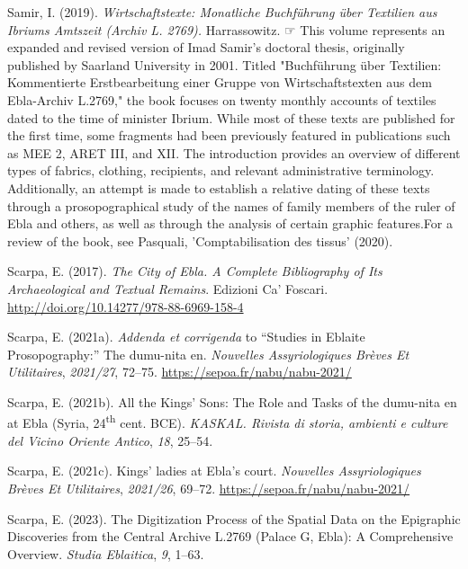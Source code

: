 \documentclass[
]{book}
\newlength{\cslhangindent}
\newlength{\cslentryspacingunit} %
\newenvironment{CSLReferences}[2] %
 {%
  \setlength{\parindent}{0pt}
  \ifodd #1
  \let\oldpar\par
  \def\par{\hangindent=\cslhangindent\oldpar}
  \fi
  \setlength{\parskip}{#2\cslentryspacingunit}
 }%
 {}
\newcommand{\CSLBlock}[1]{#1\hfill\break}
\begin{document}
\begin{CSLReferences}{1}{0}
\leavevmode{}%
Samir, I. (2019). \emph{Wirtschaftstexte: Monatliche Buchführung über Textilien aus Ibriums Amtszeit (Archiv L. 2769).} Harrassowitz.
\CSLBlock{\newline☞ This volume represents an expanded and revised version of Imad Samir's doctoral thesis, originally published by Saarland University in 2001. Titled "Buchführung über Textilien: Kommentierte Erstbearbeitung einer Gruppe von Wirtschaftstexten aus dem Ebla-Archiv L.2769," the book focuses on twenty monthly accounts of textiles dated to the time of minister Ibrium. While most of these texts are published for the first time, some fragments had been previously featured in publications such as MEE 2, ARET III, and XII. The introduction provides an overview of different types of fabrics, clothing, recipients, and relevant administrative terminology. Additionally, an attempt is made to establish a relative dating of these texts through a prosopographical study of the names of family members of the ruler of Ebla and others, as well as through the analysis of certain graphic features.For a review of the book, see Pasquali, 'Comptabilisation des tissus' (2020).}

\leavevmode{}%
Scarpa, E. (2017). \emph{The {City} of {Ebla}. {A Complete Bibliography} of {Its Archaeological} and {Textual Remains}}. Edizioni Ca' Foscari. \url{http://doi.org/10.14277/978-88-6969-158-4}

\leavevmode{}%
Scarpa, E. (2021a). \emph{Addenda et corrigenda} to {``{Studies} in {Eblaite Prosopography}:''} The dumu-nita en. \emph{Nouvelles Assyriologiques Brèves Et Utilitaires}, \emph{2021/27}, 72--75. \url{https://sepoa.fr/nabu/nabu-2021/}

\leavevmode{}%
Scarpa, E. (2021b). All the Kings' Sons: The Role and Tasks of the dumu-nita en at Ebla (Syria, 24\textsuperscript{th} cent. BCE). \emph{KASKAL. Rivista di storia, ambienti e culture del Vicino Oriente Antico}, \emph{18}, 25--54.

\leavevmode{}%
Scarpa, E. (2021c). Kings' ladies at {Ebla}'s court. \emph{Nouvelles Assyriologiques Brèves Et Utilitaires}, \emph{2021/26}, 69--72. \url{https://sepoa.fr/nabu/nabu-2021/}

\leavevmode{}%
Scarpa, E. (2023). The {Digitization Process} of the {Spatial Data} on the {Epigraphic Discoveries} from the {Central Archive L}.2769 ({Palace G}, {Ebla}): {A Comprehensive Overview}. \emph{Studia Eblaitica}, \emph{9}, 1--63.


\end{CSLReferences}
\end{document}
